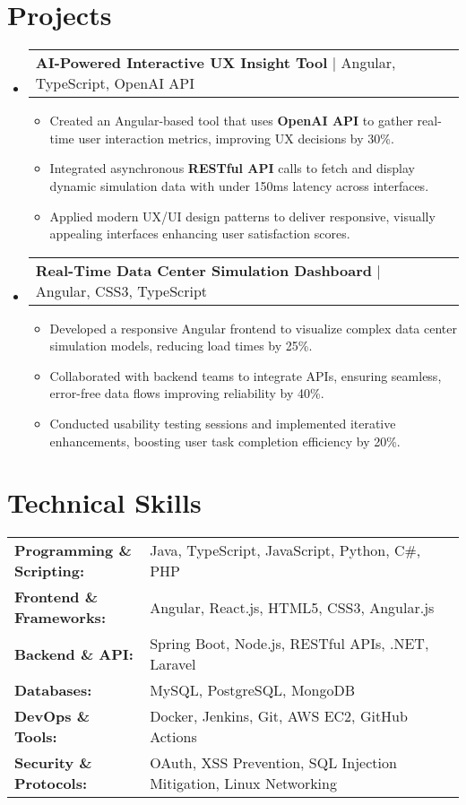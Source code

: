 \documentclass[letterpaper,11pt]{article}
\makeatletter
\newcommand{\resumeItem}[1]{
  \item\footnotesize{
    {#1 \vspace{-2pt}}
  }
}
\newcommand{\resumeProjectHeading}[2]{
    \item
    \begin{tabular*}{1.001\textwidth}{l@{\extracolsep{\fill}}r}
      \small#1 & \textbf{\small #2}\\
    \end{tabular*}\vspace{-7pt}
}
\newcommand{\resumeSubHeadingListStart}{\begin{itemize}[leftmargin=0pt, label={}]}
\newcommand{\resumeSubHeadingListEnd}{\end{itemize}}
\newcommand{\resumeItemListStart}{\begin{itemize}[leftmargin=*]}
\newcommand{\resumeItemListEnd}{\end{itemize}\vspace{-5pt}}
\makeatother
\begin{document}
\section{Projects}
    \vspace{-5pt}
    \resumeSubHeadingListStart
      \resumeProjectHeading
          {\textbf{AI-Powered Interactive UX Insight Tool} | Angular, TypeScript, OpenAI API}{}
          \resumeItemListStart
              \resumeItem{Created an Angular-based tool that uses \textbf{OpenAI API} to gather real-time user interaction metrics, improving UX decisions by 30\%.}
              \resumeItem{Integrated asynchronous \textbf{RESTful API} calls to fetch and display dynamic simulation data with under 150ms latency across interfaces.}
              \resumeItem{Applied modern UX/UI design patterns to deliver responsive, visually appealing interfaces enhancing user satisfaction scores.}
          \resumeItemListEnd
          \vspace{-16pt}
      \resumeProjectHeading
          {\textbf{Real-Time Data Center Simulation Dashboard} | Angular, CSS3, TypeScript}{}
          \resumeItemListStart
              \resumeItem{Developed a responsive Angular frontend to visualize complex data center simulation models, reducing load times by 25\%.}
              \resumeItem{Collaborated with backend teams to integrate APIs, ensuring seamless, error-free data flows improving reliability by 40\%.}
              \resumeItem{Conducted usability testing sessions and implemented iterative enhancements, boosting user task completion efficiency by 20\%.}
          \resumeItemListEnd
    \resumeSubHeadingListEnd
\vspace{-10pt}
\section{Technical Skills}
        \vspace{-14pt}
        \begin{table}[h]
            \footnotesize
            \begin{tabular}{p{0.3\linewidth} p{0.7\linewidth}}
                \textbf{Programming \& Scripting:} & Java, TypeScript, JavaScript, Python, C\#, PHP \\
                \textbf{Frontend \& Frameworks:} & Angular, React.js, HTML5, CSS3, Angular.js \\
                \textbf{Backend \& API:} & Spring Boot, Node.js, RESTful APIs, .NET, Laravel \\
                \textbf{Databases:} & MySQL, PostgreSQL, MongoDB \\
                \textbf{DevOps \& Tools:} & Docker, Jenkins, Git, AWS EC2, GitHub Actions \\
                \textbf{Security \& Protocols:} & OAuth, XSS Prevention, SQL Injection Mitigation, Linux Networking \\
            \end{tabular}
        \end{table}
\end{document}
